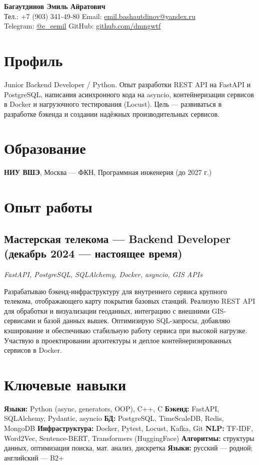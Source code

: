 \documentclass[a4paper,11pt]{article}
\begin{document}
	
	\begin{center}
		{\Large\textbf{Багаутдинов Эмиль Айратович}}\\[3pt]
		\normalsize
		Тел.: +7 (903) 341-49-80 \quad
		Email: \href{mailto:emil.bashautdinov@yandex.ru}{emil.bashautdinov@yandex.ru} \\
		Telegram: \href{https://t.me/e_eemil}{@e_eemil} \quad
		GitHub: \href{https://github.com/dmngwtf}{github.com/dmngwtf}
	\end{center}
	
	\vspace{4pt}
	
	\section*{Профиль}
	Junior Backend Developer / Python.  
	Опыт разработки REST API на FastAPI и PostgreSQL, написания асинхронного кода на asyncio, контейнеризации сервисов в Docker и нагрузочного тестирования (Locust).  
	Цель — развиваться в разработке бэкенда и создании надёжных производительных сервисов.
	
	\section*{Образование}
	\textbf{НИУ ВШЭ}, Москва — ФКН, Программная инженерия (до 2027 г.)
	\section*{Опыт работы}
	
	\subsection*{Мастерская телекома — Backend Developer (декабрь 2024 — настоящее время)}
	\textit{FastAPI, PostgreSQL, SQLAlchemy, Docker, asyncio, GIS APIs}
	
	Разрабатываю бэкенд-инфраструктуру для внутреннего сервиса крупного телекома, отображающего карту покрытия базовых станций.  
	Реализую REST API для обработки и визуализации геоданных, интеграцию с внешними GIS-сервисами и базой данных вышек.  
	Оптимизирую SQL-запросы, добавляю кэширование и обеспечиваю стабильную работу сервиса при высокой нагрузке.  
	Участвую в проектировании архитектуры и деплое контейнеризированных сервисов в Docker.
	
	\section*{Ключевые навыки}
	\textbf{Языки:} Python (async, generators, OOP), C++, C  
	\textbf{Бэкенд:} FastAPI, SQLAlchemy, Pydantic, asyncio  
	\textbf{БД:} PostgreSQL, TimeScaleDB, Redis, MongoDB  
	\textbf{Инфраструктура:} Docker, Pytest, Locust, Kafka, Git  
	\textbf{NLP:} TF-IDF, Word2Vec, Sentence-BERT, Transformers (HuggingFace)  
	\textbf{Алгоритмы:} структуры данных, оптимизация поиска, мат. анализ, дискретка  
	\textbf{Языки:} русский — родной; английский — B2+
	
\end{document}
